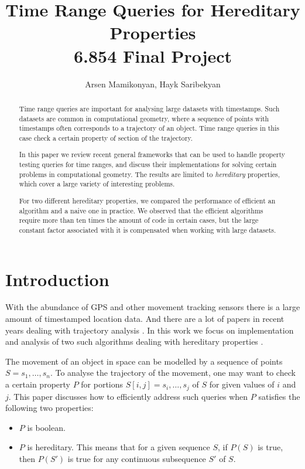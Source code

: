\documentclass{article}
\begin{document}
\title{Time Range Queries for Hereditary Properties \\ \large 6.854 Final Project}
\author{Arsen Mamikonyan, Hayk Saribekyan}

\maketitle

\begin{abstract}
    Time range queries are important for analysing large datasets
    with timestamps. Such datasets are common in computational
    geometry, where a sequence of points with timestamps often
    corresponds to a trajectory of an object. Time range queries
    in this case check a certain property of section of the trajectory.

    In this paper we review recent general frameworks that can be
    used to handle property testing queries for time ranges, and
    discuss their implementations for solving certain problems in
    computational geometry. The results are limited to \textit{hereditary}
    properties, which cover a large variety of interesting problems.

    For two different hereditary properties, we compared the
    performance of efficient an algorithm and a naive one in practice.
    We observed that the efficient algorithms require more than ten
    times the amount of code in certain cases, but the large constant
    factor associated with it is compensated when working with large
    datasets.
\end{abstract}

\section{Introduction}
\label{sec:intro}

With the abundance of GPS and other movement tracking sensors there
is a large amount of timestamped location data. And there are a lot
of papers in recent years dealing with trajectory analysis
\cite{buchin2011finding, gudmundsson2007efficient, aronov2016segmentation}.
In this work we focus on implementation and analysis of two such
algorithms dealing with hereditary properties \cite{bokal2015,
chan2016}.

The movement of an object in space can be modelled by a sequence
of points $S = s_1, \dots, s_n$. To analyse the trajectory of the
movement, one may want to check a certain property $P$ for portions
$S[i, j] = s_i, \dots, s_j$ of $S$ for given values of $i$ and $j$.
This paper discusses how to efficiently address such queries when
$P$ satisfies the following two properties:
\begin{itemize}
    \item $P$ is boolean.
    \item $P$ is hereditary. This means that for a given sequence
    $S$, if $P(S)$ is true, then $P(S')$ is true for any continuous
    subsequence $S'$ of $S$.
\end{itemize}
\end{document}

